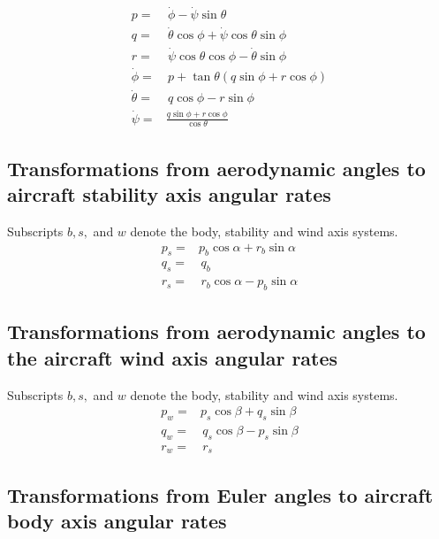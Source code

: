 \documentclass[
]{book}
\begin{document}
\begin{align}
p =& \, \dot{\phi} -\dot{\psi} \sin\theta\\
q =& \, \dot{\theta} \cos\phi + \dot{\psi} \cos{\theta} \sin{\phi}\\
r =& \, \dot{\psi} \cos\theta \cos\phi - \dot{\theta} \sin\phi\\
\dot{\phi} =& \, p + \tan\theta(q \sin\phi + r\cos\phi) \\
\dot{\theta}=& \, q \cos\phi - r\sin\phi\\
\dot{\psi} =& \frac{q \sin\phi + r \cos\phi}{\cos\theta} \, 
\end{align}

\hypertarget{transformations-from-aerodynamic-angles-to-aircraft-stability-axis-angular-rates}{%
\subsection{Transformations from aerodynamic angles to aircraft stability axis angular rates}\label{transformations-from-aerodynamic-angles-to-aircraft-stability-axis-angular-rates}}

Subscripts \(b, s,\) and \(w\) denote the body, stability and wind axis systems.
\begin{align}
p_s =& p_b \cos\alpha + r_b \sin\alpha\, \\
q_s =& \, q_b\\
r_s =& \, r_b \cos\alpha - p_b \sin\alpha
\end{align}

\hypertarget{transformations-from-aerodynamic-angles-to-the-aircraft-wind-axis-angular-rates}{%
\subsection{Transformations from aerodynamic angles to the aircraft wind axis angular rates}\label{transformations-from-aerodynamic-angles-to-the-aircraft-wind-axis-angular-rates}}

Subscripts \(b, s,\) and \(w\) denote the body, stability and wind axis systems.
\begin{align}
p_w =& p_s \cos\beta + q_s \sin\beta\, \\
q_w =& \, q_s \cos\beta - p_s\sin\beta\\
r_w =& \, r_s
\end{align}

\hypertarget{transformations-from-euler-angles-to-aircraft-body-axis-angular-rates}{%
\subsection{Transformations from Euler angles to aircraft body axis angular rates}\label{transformations-from-euler-angles-to-aircraft-body-axis-angular-rates}}
\end{document}
